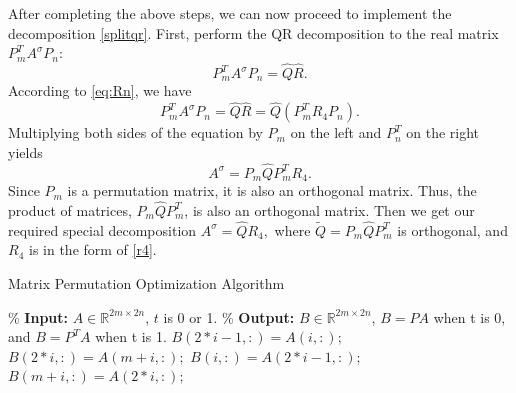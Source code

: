 \documentclass[3p]{elsarticle}
\numberwithin{equation}{section}
\begin{document}
After completing the above steps, we can now proceed to implement the decomposition \eqref{splitqr}.
First, perform the QR decomposition to the real matrix $P_m^TA^\sigma P_{n}$:
$$P_m^TA^\sigma P_n = \widehat{Q}\widehat{R}.$$
According to \eqref{eq:Rn}, we have
$$
P_m^TA^\sigma P_n = \widehat{Q}\widehat{R} = \widehat{Q}(P_m^TR_4P_n).
$$
Multiplying both sides of the equation by $P_m$ on the left and $P_n^T$ on the right yields
$$
A^\sigma=P_m\widehat{Q}P_m^T R_4.
$$
Since $P_m$ is a permutation matrix, it is also an orthogonal matrix. Thus, the product of matrices, $P_m\widehat{Q}P_m^T$, is also an orthogonal matrix. Then we get our required special decomposition $A^\sigma=\widehat{Q}R_4,$ where $\widetilde{Q}=P_m\widehat{Q}P_m^T$ is orthogonal, and $R_4$ is in the form of \eqref{r4}.




\begin{algorithm}[htbp]
    \caption{Matrix Permutation Optimization Algorithm}
    \label{alg:Permutation Optimization}
    \begin{algorithmic}
        \State \% \textbf{Input:} $ A\in \mathbb{R}^{2m\times 2n}$, $t$ is 0 or 1.
        \State \% \textbf{Output:} $B \in\mathbb{R}^{2m\times 2n}$, $B=PA$ when t is 0, and $B=P^TA$ when t is 1.
            \State $B(2*i-1, :) = A(i, :);$
            \State $B(2*i, :) = A(m+i, :);$
          \End
        \Else
            \State $B(i, :) = A(2*i-1, :);$
            \State $B(m+i, :) = A(2*i, :);$
          \End
        \End
    \End 
    \end{algorithmic}
\end{algorithm}
\end{document}
